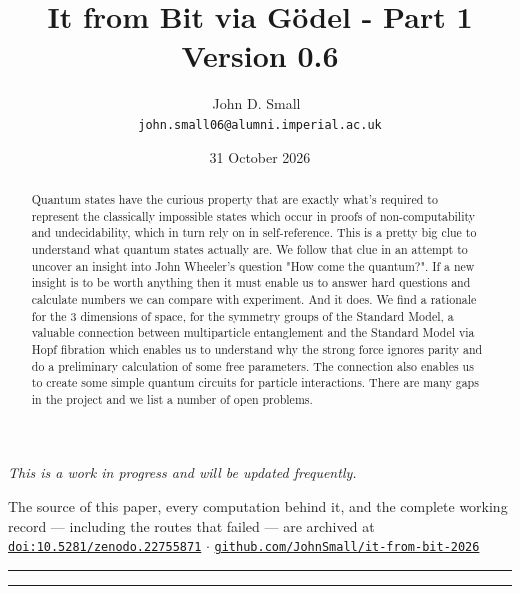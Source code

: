 \documentclass{article}
\title{It from Bit via Gödel - Part 1\\[0.4em]
  \large\normalfont Version 0.6}
\author{John D. Small\
  \\
  \small\texttt{john.small06@alumni.imperial.ac.uk}}
\date{31 October 2026}
\theoremstyle{plain}
\theoremstyle{definition}
\theoremstyle{remark}\newtheorem*{remark}{Remark}
\begin{document}
\maketitle
\begin{center}
\itshape This is a work in progress and will be updated frequently.
\end{center}

\begin{center}\small
The source of this paper, every computation behind it, and the complete
working record --- including the routes that failed --- are archived at\\
\href{https://doi.org/10.5281/zenodo.22755871}{\texttt{doi:10.5281/zenodo.22755871}}
\quad$\cdot$\quad
\href{https://github.com/JohnSmall/it-from-bit-2026}{\texttt{github.com/JohnSmall/it-from-bit-2026}}
\end{center}

\medskip

\noindent\rule{\textwidth}{0.4pt}
\begin{abstract}
Quantum states have the curious property that are exactly what's required to represent the
classically impossible states which occur in proofs of non-computability and undecidability,
which in turn rely on in self-reference. This is a pretty big clue to understand what quantum
states actually are. We follow that clue in an attempt to uncover an insight into John Wheeler's
question "How come the quantum?". If a new insight is to be worth anything then it must enable
us to answer hard questions and calculate numbers we can compare with experiment. And it does.
We find a rationale for the 3 dimensions of space, for the symmetry groups of the Standard
Model, a valuable connection between multiparticle entanglement and the Standard Model via Hopf
fibration which enables us to understand why the strong force ignores parity and do a
preliminary calculation of some free parameters. The connection also enables us to create some
simple quantum circuits for particle interactions. There are many gaps in the project and we
list a number of open problems.
\end{abstract}
\noindent\rule{\textwidth}{0.4pt}
\end{document}

